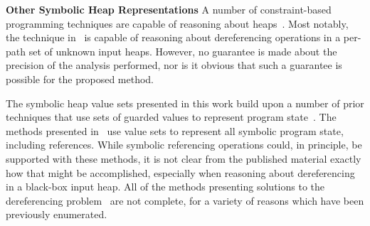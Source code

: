 \noindent\textbf{Other Symbolic Heap Representations}
%
A number of constraint-based programming techniques are capable of reasoning about heaps~\cite{Degrave:2010,Charreteur:2009,Albert:2013}. Most notably, the technique in~\cite{Albert:2013} is capable of reasoning about dereferencing operations in a per-path set of unknown input heaps. However, no guarantee is made about the precision of the analysis performed, nor is it obvious that such a guarantee is possible for the proposed method.

The symbolic heap value sets presented in this work build upon a number of prior techniques that use sets of guarded values to represent program state~\cite{Sen:2014,Torlak:2014,Yorsh:2008,Xie:2005,Dillig:2011,Elkarablieh:2009}. The methods presented in~\cite{Sen:2014,Torlak:2014,Yorsh:2008} use value sets to represent all symbolic program state, including references. While symbolic referencing operations could, in principle, be supported with these methods, it is not clear from the published material exactly how that might be accomplished, especially when reasoning about dereferencing in a black-box input heap. All of the methods presenting solutions to the dereferencing problem~\cite{Xie:2005,Dillig:2011,Elkarablieh:2009} are not complete, for a variety of reasons which have been previously enumerated.


